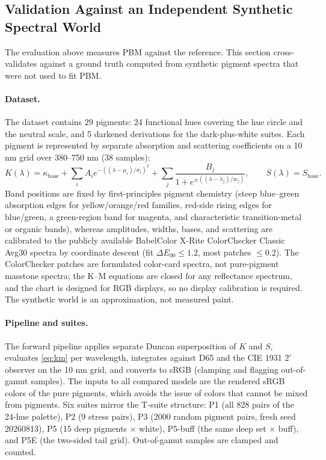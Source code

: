\subsection{Validation Against an Independent Synthetic Spectral World}
\label{sec:synthetic}

The evaluation above measures PBM against the reference. This section cross-validates against a ground truth computed from synthetic pigment spectra that were not used to fit PBM.

\paragraph{Dataset.}
The dataset contains 29 pigments: 24 functional hues covering the hue circle and the neutral scale, and 5 darkened derivations for the dark-plus-white suites. Each pigment is represented by separate absorption and scattering coefficients on a 10 nm grid over 380--750 nm (38 samples):
\begin{equation}
K(\lambda)=\kappa_{\mathrm{base}}+\sum_{i}A_{i}e^{-((\lambda-\mu_{i})/\sigma_{i})^{2}}
+\sum_{j}\frac{B_{j}}{1+e^{\pm((\lambda-\lambda_{j})/w_{j})}},
\qquad S(\lambda)=S_{\mathrm{base}}.
\label{eq:synthetic}
\end{equation}
Band positions are fixed by first-principles pigment chemistry (steep blue--green absorption edges for yellow/orange/red families, red-side rising edges for blue/green, a green-region band for magenta, and characteristic transition-metal or organic bands), whereas amplitudes, widths, bases, and scattering are calibrated to the publicly available BabelColor X-Rite ColorChecker Classic Avg30 spectra \cite{pascale2012} by coordinate descent (fit $\Delta E_{00}\le1.2$, most patches $\le0.2$). The ColorChecker patches are formulated color-card spectra, not pure-pigment masstone spectra; the K--M equations are closed for any reflectance spectrum, and the chart is designed for RGB displays, so no display calibration is required. The synthetic world is an approximation, not measured paint.

\paragraph{Pipeline and suites.}
The forward pipeline applies separate Duncan superposition of $K$ and $S$, evaluates \cref{eq:km} per wavelength, integrates against D65 and the CIE 1931 $2^{\circ}$ observer on the 10 nm grid, and converts to sRGB (clamping and flagging out-of-gamut samples). The inputs to all compared models are the rendered sRGB colors of the pure pigments, which avoids the issue of colors that cannot be mixed from pigments. Six suites mirror the T-suite structure: P1 (all 828 pairs of the 24-hue palette), P2 (9 stress pairs), P3 (2000 random pigment pairs, fresh seed 20260813), P5 (15 deep pigments $\times$ white), P5-buff (the same deep set $\times$ buff), and P5E (the two-sided tail grid). Out-of-gamut samples are clamped and counted.

